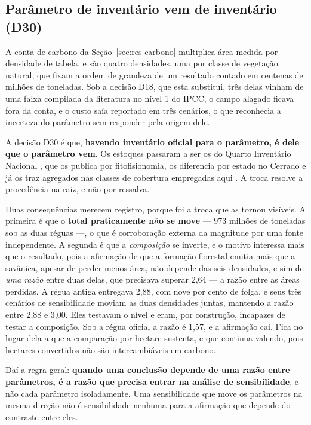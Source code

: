 \subsection{Parâmetro de inventário vem de inventário (D30)}
\label{sec:met-d30}

A conta de carbono da Seção~\ref{sec:res-carbono} multiplica área medida por
densidade de tabela, e são quatro densidades, uma por classe de vegetação
natural, que fixam a ordem de grandeza de um resultado contado em centenas de
milhões de toneladas. Sob a decisão D18, que esta substitui, três delas vinham
de uma faixa compilada da literatura no nível 1 do IPCC, o campo alagado ficava
fora da conta, e o custo saía reportado em três cenários, o que reconhecia a
incerteza do parâmetro sem responder pela origem dele.

A decisão D30 é que, \textbf{havendo inventário oficial para o parâmetro, é
dele que o parâmetro vem}. Os estoques passaram a ser os do Quarto Inventário
Nacional \cite{MCTI2020}, que os publica por fitofisionomia, os diferencia por
estado no Cerrado e já os traz agregados nas classes de cobertura empregadas
aqui \cite{SEEG2025}. A troca resolve a procedência na raiz, e não por
ressalva.

Duas consequências merecem registro, porque foi a troca que as tornou visíveis.
A primeira é que o \textbf{total praticamente não se move} --- 973 milhões de toneladas sob as
duas réguas ---, o que é corroboração externa da magnitude por uma fonte
independente. A segunda é que a \emph{composição} se inverte, e o motivo
interessa mais que o resultado, pois a afirmação de que a formação florestal emitia
mais que a savânica, apesar de perder menos área, não depende das seis
densidades, e sim de \emph{uma razão} entre duas delas, que precisava superar
2,64 --- a razão entre as áreas perdidas. A régua antiga entregava 2,88, com
nove por cento de folga, e seus três cenários de sensibilidade moviam as duas
densidades juntas, mantendo a razão entre 2,88 e 3,00. Eles testavam o nível e
eram, por construção, incapazes de testar a composição. Sob a régua oficial a
razão é 1,57, e a afirmação cai. Fica no lugar dela a que a comparação por
hectare sustenta, e que continua valendo, pois hectares convertidos não são
intercambiáveis em carbono.

Daí a regra geral: \textbf{quando uma conclusão depende de uma razão entre
parâmetros, é a razão que precisa entrar na análise de sensibilidade}, e não
cada parâmetro isoladamente. Uma sensibilidade que move os parâmetros na mesma
direção não é sensibilidade nenhuma para a afirmação que depende do contraste
entre eles.

